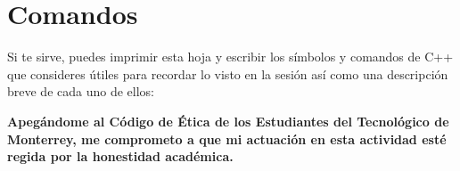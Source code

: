 \documentclass[spanish, 10pt]{article}
\begin{document}
\pagebreak

\section*{Comandos}

Si te sirve, puedes imprimir esta hoja y escribir los símbolos y comandos de C++ que consideres útiles para recordar lo visto en la sesión así como una descripción breve de cada uno de ellos:

\vfill

\textbf{Apegándome al Código de Ética de los Estudiantes del Tecnológico de Monterrey, me comprometo a que mi actuación en esta actividad esté regida por la honestidad académica.}
\end{document}
